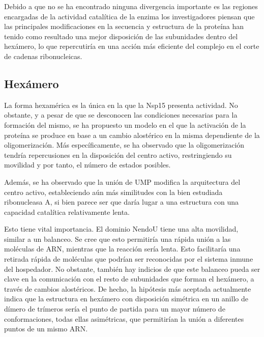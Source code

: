 \documentclass[12pt]{article}
\begin{document}
Debido a que no se ha encontrado ninguna divergencia importante es las regiones encargadas de la actividad catalítica de la enzima los investigadores piensan que las principales modificaciones en la secuencia y estructura de la proteína han tenido como resultado una mejor disposición de las subunidades dentro del hexámero, lo que repercutiría en una acción más eficiente del complejo en el corte de cadenas ribonucleicas.

\subsection{Hexámero}
La forma hexamérica es la única en la que la Nsp15 presenta actividad. No obstante, y a pesar de que se desconocen las condiciones necesarias para la formación del mismo, se ha propuesto un modelo en el que la activación de la proteína se produce en base a un cambio alostérico en la misma dependiente de la oligomerización. Más específicamente, se ha observado que la oligomerización tendría repercusiones en la disposición del centro activo, restringiendo su movilidad y por tanto, el número de estados posibles. 
\newline

Además, se ha observado que la unión de UMP modifica la arquitectura del centro activo, estableciendo aún más similitudes con la bien estudiada ribonucleasa A, si bien parece ser que daría lugar a una estructura con una capacidad catalítica relativamente lenta.
\newline

Esto tiene vital importancia. El dominio NendoU tiene una alta movilidad, similar a un balanceo. Se cree que esto permitiría una rápida unión a las moléculas de ARN, mientras que la reacción sería lenta. Esto facilitaría una retirada rápida de moléculas que podrían ser reconocidas por el sistema inmune del hospedador. No obstante, también hay indicios de que este balanceo pueda ser clave en la comunicación con el resto de subunidades que forman el hexámero, a través de cambios alostéricos. De hecho, la hipótesis más aceptada actualmente indica que la estructura en hexámero con disposición simétrica en un anillo de dímero de trímeros sería el punto de partida para un mayor número de conformaciones, todas ellas asimétricas, que permitirían la unión a diferentes puntos de un mismo ARN. 
\newline
\end{document}
